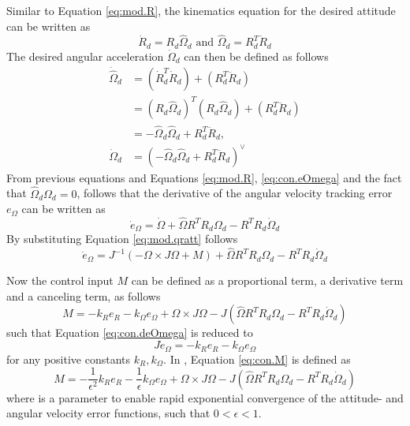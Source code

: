 Similar to Equation \ref{eq:mod.R}, the kinematics equation for the desired attitude can be written as
\begin{equation}\label{eq:con.dotRd}
\dot{R}_d=R_d\hat{\Omega}_d \text{ and } \hat{\Omega}_d=R_d^T\dot{R}_d
\end{equation}
The desired angular acceleration $ \dot{\Omega}_d $ can then be defined as follows
\begin{equation}\label{key}
\begin{aligned}
\dot{\hat{\Omega}}_d&=(\dot{R}_d^T\dot{R}_d)+(R_d^T\ddot{R}_d)\\
&=(R_d\hat{\Omega}_d)^T(R_d\hat{\Omega}_d)+(R_d^T\ddot{R}_d)\\
&=-\hat{\Omega}_d\hat{\Omega}_d+R_d^T\ddot{R}_d,\\
\dot{\Omega}_d&=(-\hat{\Omega}_d\hat{\Omega}_d+R_d^T\ddot{R}_d)^\vee
\end{aligned}
\end{equation}
From previous equations and Equations \ref{eq:mod.R}, \ref{eq:con.eOmega} and the fact that $ \hat{\Omega}_d\Omega_d =0$, follows that the derivative of the angular velocity tracking error $ e_\Omega $ can be written as 
\begin{equation}\label{eq:con.deOmega}
\dot{e}_\Omega=\dot{\Omega}+\hat{\Omega}R^TR_d\Omega_d-R^TR_d\dot{\Omega}_d
\end{equation}
By substituting Equation \ref{eq:mod.qratt} follows
\begin{equation}\label{eq:con.dOmega}
\dot{e}_\Omega=J^{-1}(-\Omega\times J\Omega + M)+\hat{\Omega}R^TR_d\Omega_d-R^TR_d\dot{\Omega}_d
\end{equation}

Now the control input $ M $ can be defined as a proportional term, a derivative term and a canceling term, as follows \cite{Sreenath2013c}
\begin{equation}\label{eq:con.M}
M = -k_Re_R-k_\Omega e_\Omega+\Omega\times J\Omega-J(\hat{\Omega}R^TR_d\Omega_d-R^TR_d\dot{\Omega}_d)
\end{equation}
such that Equation \ref{eq:con.deOmega} is reduced to
\begin{equation}\label{eq:con.JdeOmega}
J\dot{e}_\Omega=-k_Re_R-k_\Omega e_\Omega
\end{equation}
for any positive constants $ k_R, k_\Omega $.
In \cite{Sreenath2013b}, Equation \ref{eq:con.M} is defined as
\begin{equation}\label{eq:con.Meps}
M = -\frac{1}{\epsilon^2}k_Re_R-\frac{1}{\epsilon}k_\Omega e_\Omega+\Omega\times J\Omega-J(\hat{\Omega}R^TR_d\Omega_d-R^TR_d\dot{\Omega}_d)
\end{equation}
where  is a parameter to enable rapid exponential convergence of the attitude- and angular velocity error functions, such that $ 0<\epsilon<1 $.\\

